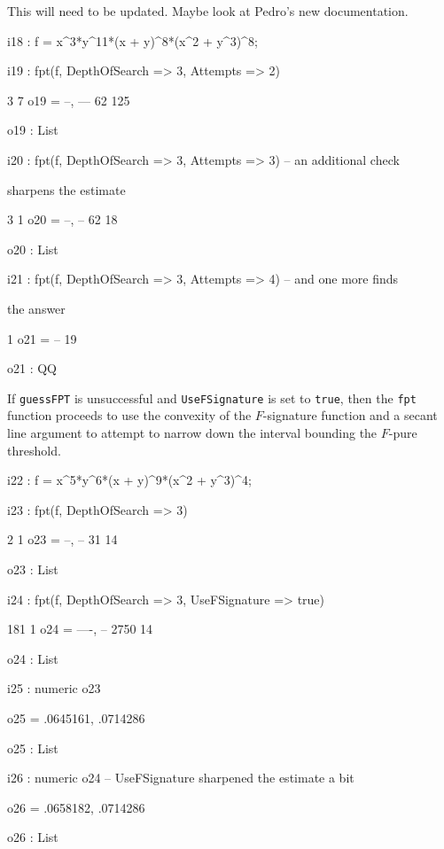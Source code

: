 \documentclass{amsart}
\begin{document}
{\color{red}  This will need to be updated.  Maybe look at Pedro's new documentation.}

{\small
{}
\begin{MyVerbatim}

i18 : f = x^3*y^11*(x + y)^8*(x^2 + y^3)^8;

i19 : fpt(f, DepthOfSearch => 3, Attempts => 2)

        3   7
o19 = {--, ---}
       62  125

o19 : List

i20 : fpt(f, DepthOfSearch => 3, Attempts => 3) -- an additional check

      sharpens the estimate

        3   1
o20 = {--, --}
       62  18

o20 : List

i21 : fpt(f, DepthOfSearch => 3, Attempts => 4) -- and one more finds

      the answer

       1
o21 = --
      19

o21 : QQ
\end{MyVerbatim}
}
\medspace

If {\tt guessFPT} is unsuccessful and {\tt UseFSignature} is set to {\tt true}, then the {\tt fpt} function proceeds to use the convexity of the $F$-signature function and a secant line argument to attempt to narrow down the interval bounding the $F$-pure threshold.

{\small
{}
\begin{MyVerbatim}

i22 : f = x^5*y^6*(x + y)^9*(x^2 + y^3)^4;

i23 : fpt(f, DepthOfSearch => 3)

        2   1
o23 = {--, --}
       31  14

o23 : List

i24 : fpt(f, DepthOfSearch => 3, UseFSignature => true)

        181   1
o24 = {----, --}
       2750  14

o24 : List

i25 : numeric o23

o25 = {.0645161, .0714286}

o25 : List

i26 : numeric o24 -- UseFSignature sharpened the estimate a bit

o26 = {.0658182, .0714286}

o26 : List
\end{MyVerbatim}
}
\medspace
\end{document}
